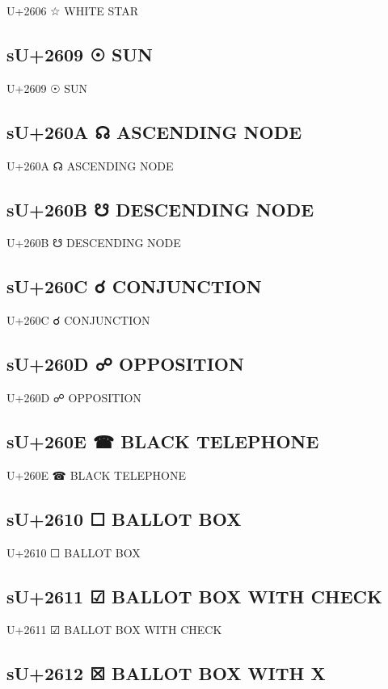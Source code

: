 U+2606 ☆ WHITE STAR

\subsection{sU+2609 ☉ SUN}

U+2609 ☉ SUN

\subsection{sU+260A ☊ ASCENDING NODE}

U+260A ☊ ASCENDING NODE

\subsection{sU+260B ☋ DESCENDING NODE}

U+260B ☋ DESCENDING NODE

\subsection{sU+260C ☌ CONJUNCTION}

U+260C ☌ CONJUNCTION

\subsection{sU+260D ☍ OPPOSITION}

U+260D ☍ OPPOSITION

\subsection{sU+260E ☎ BLACK TELEPHONE}

U+260E ☎ BLACK TELEPHONE

\subsection{sU+2610 ☐ BALLOT BOX}

U+2610 ☐ BALLOT BOX

\subsection{sU+2611 ☑ BALLOT BOX WITH CHECK}

U+2611 ☑ BALLOT BOX WITH CHECK

\subsection{sU+2612 ☒ BALLOT BOX WITH X}

